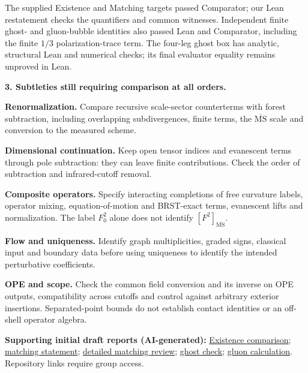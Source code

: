 \documentclass[11pt]{article}
\newcommand{\reviewdoc}[2]{\href{https://github.com/yang-mills-group/submissions/blob/main/reviews/openai-20261104/#1}{#2}}
\begin{document}
The supplied Existence and Matching targets passed Comparator; our Lean
restatement checks the quantifiers and common witnesses. Independent finite
ghost- and gluon-bubble identities also passed Lean and Comparator, including
the finite $1/3$ polarization-trace term. The four-leg ghost box has analytic,
structural Lean and numerical checks; its final evaluator equality remains
unproved in Lean.

\textbf{3. Subtleties still requiring comparison at all orders.}
\begin{list}{\textbullet}{\setlength{\leftmargin}{12pt}\setlength{\itemsep}{2pt}\setlength{\parsep}{0pt}\setlength{\topsep}{2pt}}
\item \textbf{Renormalization.} Compare recursive scale-sector counterterms with
forest subtraction, including overlapping subdivergences, finite terms, the
$\overline{\mathrm{MS}}$ scale and conversion to the measured scheme.
\item \textbf{Dimensional continuation.} Keep open tensor indices and evanescent terms
through pole subtraction: they can leave finite contributions. Check the order
of subtraction and infrared-cutoff removal.
\item \textbf{Composite operators.} Specify interacting completions of free
curvature labels, operator mixing, equation-of-motion and BRST-exact terms,
evanescent lifts and normalization. The label $F_0^2$ alone does not identify
$[F^2]_{\overline{\mathrm{MS}}}$.
\item \textbf{Flow and uniqueness.} Identify graph multiplicities, graded signs,
classical input and boundary data before using uniqueness to identify the
intended perturbative coefficients.
\item \textbf{OPE and scope.} Check the common field conversion and its inverse on
OPE outputs, compatibility across cutoffs and control against arbitrary exterior
insertions. Separated-point bounds do not establish contact identities or an
off-shell operator algebra.
\end{list}


{\small\textbf{Supporting initial draft reports (AI-generated):}
\reviewdoc{docs/existence/october-november-existence-comparison.pdf}{Existence comparison};
\reviewdoc{docs/matching/all-orders-statement-review.md}{matching statement};
\reviewdoc{docs/matching/november-matching-assessment.pdf}{detailed matching review};
\reviewdoc{docs/matching/ghost-finite-check.md}{ghost check};
\reviewdoc{docs/matching/gluon-bubble-finite-identity.pdf}{gluon calculation}.
Repository links require group access.}
\end{document}
